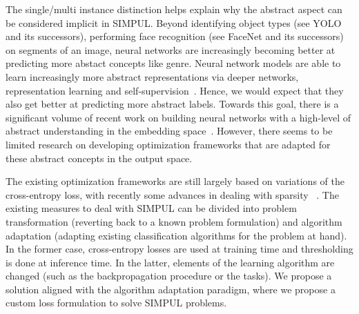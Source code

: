 The single/multi instance distinction helps explain why the abstract aspect can be considered implicit in SIMPUL. Beyond identifying object types (see YOLO \cite{YOLO} and its successors), performing face recognition (see FaceNet \cite{FaceNet} and its successors) on segments of an image, neural networks are increasingly becoming better at predicting more abstact concepts like genre.  Neural network models are able to learn increasingly more abstract representations via deeper networks, representation learning and self-supervision~\citep[see, e.g.,][]{SS,Rep}. Hence, we would expect that they also get better at predicting more abstract labels. Towards this goal, there is a significant volume of recent work on building neural networks with a high-level of abstract understanding in the embedding space~. However, there seems to be limited research on developing optimization frameworks that are adapted for these abstract concepts in the output space. 

The existing optimization frameworks are still largely based on variations of the cross-entropy loss, with recently some advances in dealing with sparsity~\citep[see, e.g.,][]{focalLoss,tencent} . The existing measures to deal with SIMPUL  can be divided into problem transformation (reverting back to a known problem formulation) and algorithm adaptation (adapting existing classification algorithms for the problem at hand). In the former case, cross-entropy losses are used at training time and thresholding is done at inference time. In the latter, elements of the learning algorithm are changed (such as the backpropagation procedure or the tasks). We propose a solution aligned with the algorithm adaptation paradigm, where we propose a custom loss formulation to solve SIMPUL problems.

